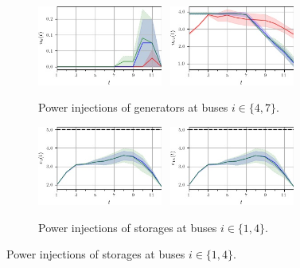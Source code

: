 \documentclass[final,3p,times,twocolumn]{elsarticle}  %
\begin{document}

\begin{figure}
	\centering
    
    \begin{subfigure}[c]{\figwidth}
    \centering
        \includegraphics[width=0.45\textwidth]{figures/time series/case57_volatile/gen_u_8104.jpg}~
    	\includegraphics[width=0.45\textwidth]{figures/time series/case57_volatile/gen_u_8107.jpg}%
    	\vspace{-2mm}	
    	\caption{Power injections of generators at buses $i \in \{4,7\}$.}
    \end{subfigure}
    
    \begin{subfigure}[c]{\figwidth}
    \centering
    	\includegraphics[width=0.45\textwidth]{figures/time series/case57_volatile/storage_e_4651.jpg}~
    	\includegraphics[width=0.45\textwidth]{figures/time series/case57_volatile/storage_e_4654.jpg}%
    	\vspace{-2mm}	
    	\caption{Power injections of storages at buses $i \in \{1,4\}$.}
    \end{subfigure}
    

\end{figure}
\end{document}
